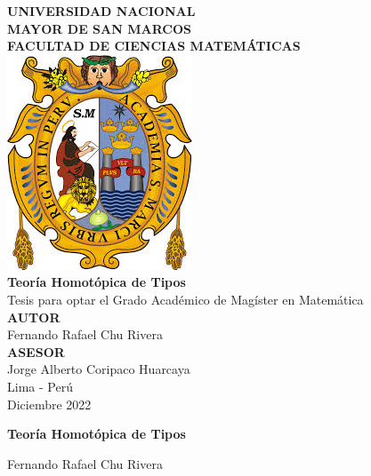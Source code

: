\documentclass[12pt]{report}
\theoremstyle{definition}
\theoremstyle{plain}
\begin{document}
\begin{titlepage}
    \setlength{\parindent}{0pt} \setlength{\parskip}{0pt}
    \begin{center}
        \textsc{\large \textbf{UNIVERSIDAD NACIONAL \\MAYOR DE SAN MARCOS}}\\[0.4cm]
        {\large \textbf{FACULTAD DE CIENCIAS MATEM\'ATICAS}}\\[2cm]

        \includegraphics[scale = 0.5]{images/shield}\\[1 cm]

        {\Large \bfseries Teoría Homot\'opica de Tipos}\\[1cm]

        Tesis para optar el Grado Acad\'emico de Mag\'ister en Matem\'atica \\[1.8 cm]

        \textbf{AUTOR}\\[0.2cm]
        Fernando Rafael Chu Rivera \\[1cm]
        \textbf{ASESOR}\\[0.2cm]
        Jorge Alberto Coripaco Huarcaya \\[2.5cm]

        Lima - Per\'u \\
        Diciembre 2022
    \end{center}
\end{titlepage}

\newpage
{}
\pagestyle{plain}
\begin{center}
    \textbf{Teoría Homot\'opica de Tipos} \\[1.5cm]
\end{center}

\begin{center}
    Fernando Rafael Chu Rivera \\[1.5cm]
\end{center}
\end{document}
